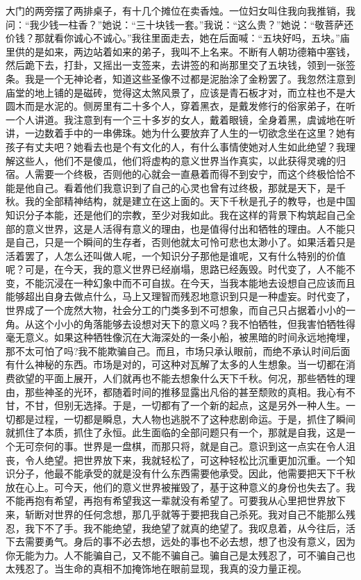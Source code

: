 \documentclass[12pt,oneside]{book}
\begin{document}
大门的两旁摆了两排桌子，有十几个摊位在卖香烛。一位妇女叫住我向我推销，我问：``我少钱一柱香？''她说：``三十块钱一套。''我说：``这么贵？''她说：``敬菩萨还价钱？那就看你诚心不诚心。''我往里面走去，她在后面喊：``五块好吗，五块。''庙里供的是如来，两边站着如来的弟子，我叫不上名来。不断有人朝功德箱中塞钱，然后跪下去，打卦，又摇出一支签来，去讲签的和尚那里交了五块钱，领到一张签条。我是一个无神论者，知道这些圣像不过都是泥胎涂了金粉罢了。我忽然注意到庙堂的地上铺的是磁砖，觉得这太煞风景了，应该是青石板才对，而立柱也不是大圆木而是水泥的。侧房里有二十多个人，穿着黑衣，是戴发修行的俗家弟子，在听一个人讲道。我注意到有一个三十多岁的女人，戴着眼镜，全身着黑，虞诚地在听讲，一边数着手中的一串佛珠。她为什么要放弃了人生的一切欲念坐在这里？她有孩子有丈夫吧？她看去也是个有文化的人，有什么事情使她对人生如此绝望？我理解这些人，他们不是傻瓜，他们将虚构的意义世界当作真实，以此获得灵魂的归宿。人需要一个终极，否则他的心就会一直悬着而得不到安宁，而这个终极恰恰不能是他自己。看着他们我意识到了自己的心灵也曾有过终极，那就是天下，是千秋。我的全部精神结构，就是建立在这上面的。天下千秋是孔子的教导，也是中国知识分子本能，还是他们的宗教，至少对我如此。我在这样的背景下构筑起自己全部的意义世界，这是人活得有意义的理由，也是值得付出和牺牲的理由。人不能只是自己，只是一个瞬间的生存者，否则他就太可怜可悲也太渺小了。如果活着只是活着罢了，人怎么还叫做人呢，一个知识分子那他是谁呢，又有什么特别的价值呢？可是，在今天，我的意义世界已经崩塌，思路已经轰毁。时代变了，人不能不变，不能沉浸在一种幻象中而不可自拔。在今天，当我本能地去设想自己应该而且能够超出自身去做点什么，马上又理智而残忍地意识到只是一种虚妄。时代变了，世界成了一个庞然大物，社会分工的门类多到不可想象，而自己只占据着小小的一角。从这个小小的角落能够去设想对天下的意义吗？我不怕牺牲，但我害怕牺牲得毫无意义。如果这种牺牲像沉在大海深处的一条小船，被黑暗的时间永远地掩埋，那不太可怕了吗?我不能欺骗自己。而且，市场只承认眼前，而绝不承认时间后面有什么神秘的东西。市场是对的，可这种对瓦解了太多的人生想象。当一切都在消费欲望的平面上展开，人们就再也不能去想象什么天下千秋。何况，那些牺牲的理由，那些神圣的光环，都随着时间的推移显露出凡俗的甚至颓败的真相。我心有不甘，不甘，但别无选择。于是，一切都有了一个新的起点，这是另外一种人生。一切都是过程，一切都是瞬息，大人物也逃脱不了这种悲剧命运。于是，抓住了瞬间就抓住了本质，抓住了永恒。此生面临的全部问题只有一个，那就是自我，这是一个无可奈何的事。世界是一盘棋，而那只将，就是自己。意识到这一点实在令人沮丧，令人绝望。把世界放下来，我就轻松了，可这种轻松比沉重更加沉重。一个知识分子，他最不能承受的就是没有什么东西需要他承受。因此，他需要把天下千秋放在心上。可今天，他们的意义世界被摧毁了，基于这种意义的身份也失去了。我不能再抱有希望，再抱有希望我这一辈就没有希望了。可要我从心里把世界放下来，斩断对世界的任何念想，那几乎就等于要把我自己杀死。我对自己不能那么残忍，我下不了手。我不能绝望，我绝望了就真的绝望了。我叹息着，从今往后，活下去需要勇气。身后的事不必去想，远处的事也不必去想，想了也没有意义，因为你无能为力。人不能骗自己，又不能不骗自己。骗自己是太残忍了，可不骗自己也太残忍了。当生命的真相不加掩饰地在眼前显现，我真的没力量正视。
\end{document}
